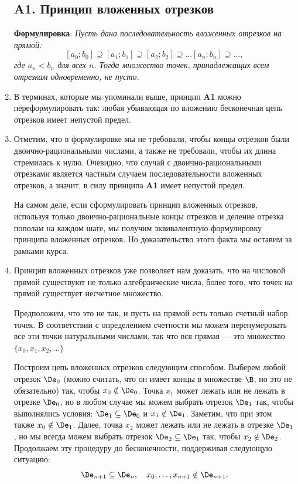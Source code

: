 \begin{enumerate}
\subsection*{A1. Принцип вложенных отрезков}

\noindent
\textbf{Формулировка}: \textit{Пусть дана последовательность вложенных отрезков на прямой:
$$
[a_0;b_0]\supseteq[a_1;b_1]\supseteq[a_2;b_2]\supseteq\dots[a_n;b_n]\supseteq\dots,
$$
где $a_n<b_n$ для всех $n$. Тогда множество точек, принадлежащих всем отрезкам одновременно, не пусто.}
\item В терминах, которые мы упоминали выше, принцип \textbf{A1} можно переформулировать так: любая убывающая по вложению бесконечная цепь отрезков имеет непустой предел.
\item Отметим, что в формулировке мы не требовали, чтобы концы отрезков были двоично-рациональными числами, а также не требовали, чтобы их длина стремилась к нулю. Очевидно, что случай с двоично-рациональными отрезками является частным случаем последовательности вложенных отрезков, а значит, в силу принципа \textbf{A1} имеет непустой предел.

На самом деле, если сформулировать принцип вложенных отрезков, используя только двоично-рациональные концы отрезков и деление отрезка пополам на каждом шаге, мы получим эквивалентную формулировку принципа вложенных отрезков. Но доказательство этого факта мы оставим за рамками курса.
\item Принцип вложенных отрезков уже позволяет нам доказать, что на числовой прямой существуют не только алгебраические числа, более того, что точек на прямой существует несчетное множество.

Предположим, что это не так, и пусть на прямой есть только счетный набор точек. В соответствии с определением счетности мы можем перенумеровать все эти точки натуральными числами, так что вся прямая --- это множество $\{x_0,x_1,x_2,\dots\}$

Построим цепь вложенных отрезков следующим способом. Выберем любой отрезок $\De_0$ (можно считать, что он имеет концы в множестве $\B$, но это не обязательно) так, чтобы $x_0\notin\De_0$. Точка $x_1$ может лежать или не лежать в отрезке $\De_0$, но в любом случае мы можем выбрать отрезок $\De_1$ так, чтобы выполнялись условия: $\De_1\subseteq\De_0$ и $x_1\notin\De_1$. Заметим, что при этом также $x_0\notin\De_1$. Далее, точка $x_2$ может лежать или не лежать в отрезке $\De_1$, но мы всегда можем выбрать отрезок $\De_2\subseteq\De_1$ так, чтобы $x_2\notin\De_2$. Продолжаем эту процедуру до бесконечности, поддерживая следующую ситуацию:
$$
\De_{n+1}\subseteq\De_n,\quad x_0,\dots,x_{n+1}\notin\De_{n+1}.
$$


\end{enumerate}
